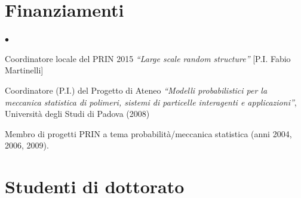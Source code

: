 \documentclass[a4paper,11pt,oneside]{amsart}
\newenvironment{myitemize}{%
\begin{list}{$\bullet$}%
 	{%
	\setlength{\itemsep}{0.3em}%
	\setlength{\topsep}{0.3em}%
	\setlength{\partopsep}{0em}%
	\setlength{\parsep}{0em}%
	\setlength{\parskip}{0em}%
	\setlength\leftmargin{1.5em}%
	\setlength\labelwidth{1.1em}%
	\setlength{\labelsep}{0.4em}%
	}%
	}%
{\end{list}}
\renewenvironment{itemize}{
\begin{myitemize}}%
{\end{myitemize}}
\begin{document}



\section{Finanziamenti}

\begin{itemize}
\item Coordinatore locale del PRIN 2015 \emph{``Large scale random structure''}
[P.I. Fabio Martinelli]

\item Coordinatore (P.I.) del Progetto di Ateneo
\textit{``Modelli probabilistici per la meccanica statistica di polimeri, 
sistemi di particelle interagenti e applicazioni''},
Università degli Studi di Padova
(2008) 

\item Membro di progetti PRIN a tema probabilità/meccanica statistica (anni 2004, 2006, 2009).
\end{itemize}


\section{Studenti di dottorato}
\end{document}
